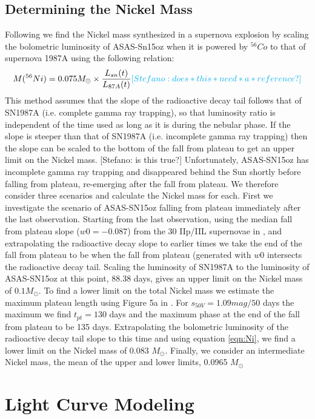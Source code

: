 \documentclass[preprint]{aastex61}
\newcommand{\stefanocomment}[1]{{\color{cyan} [{#1}]}}
\newcommand{\Stefano}[1]{\stefanocomment{Stefano: #1}}
\begin{document}
\subsection{Determining the Nickel Mass}
Following \citet{2016valenti} we find the Nickel mass synthesized in a supernova explosion by scaling the bolometric luminosity of ASAS-Sn15oz when it is powered by ${}^{56}Co$ to that of supernova 1987A using the following relation:
\begin{equation} \label{eqn:Ni}
M({}^{56}Ni) = 0.075M_{\odot} \times \frac{L_{sn}(t)}{L_{87A}(t)} \Stefano{does*this*need*a*reference?}
\end{equation}
This method assumes that the slope of the radioactive decay tail follows that of SN1987A (i.e. complete gamma ray trapping), so that luminosity ratio is independent of the time used as long as it is during the nebular phase. 
If the slope is steeper than that of SN1987A (i.e. incomplete gamma ray trapping) then the slope can be scaled to the bottom of the fall from plateau to get an upper limit on the Nickel mass. \Stefano{is this true?}
Unfortunately, ASAS-SN15oz has incomplete gamma ray trapping and disappeared behind the Sun shortly before falling from plateau, re-emerging after the fall from plateau. 
We therefore consider three scenarios and calculate the Nickel mass for each.
First we investigate the scenario of ASAS-SN15oz falling from plateau immediately after the last observation.
Starting from the last observation, using the median fall from plateau slope ($w0 = -0.087$) from the 30 IIp/IIL supernovae in \citet{2016valenti}, and extrapolating the radioactive decay slope to earlier times we take the end of the fall from plateau to be when the fall from plateau (generated with $w0$ intersects the radioactive decay tail. 
Scaling the luminosity of SN1987A to the luminosity of ASAS-SN15oz at this point, 88.38 days, gives an upper limit on the Nickel mass of $0.1 M_{\odot}$.
To find a lower limit on the total Nickel mass we estimate the maximum plateau length using Figure 5a in \citet{2016valenti}. 
For $s_{50V} = 1.09 mag/50$ days the maximum we find $t_{pt} =130$ days and the maximum phase at the end of the fall from plateau to be 135 days.
Extrapolating the bolometric luminosity of the radioactive decay tail slope to this time and using equation \ref{eqn:Ni}, we find a lower limit on the Nickel mass of 0.083 $M_{\odot}$.
Finally, we consider an intermediate Nickel mass, the mean of the upper and lower limits, 0.0965 $M_{\odot}$

\section{Light Curve Modeling}
\end{document}
